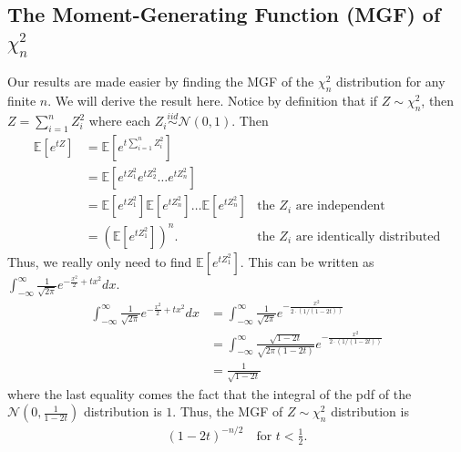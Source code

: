 \documentclass{article}
\begin{document}
    \subsection{The Moment-Generating Function (MGF) of $\chi^2_n$}
Our results are made easier by finding the MGF of the $\chi_n^2$ distribution for any finite $n$. We will derive the result here. Notice by definition that if $Z \sim \chi^2_n$, then $Z = \sum_{i=1}^n Z_i^2$ where each $Z_i \overset{iid}{\sim} \mathcal{N}(0,1)$. Then 
\begin{align*}
    \mathbb{E}[e^{tZ}]&=\mathbb{E}[e^{t\sum_{i=1}^n Z_i^2}]\\
    &=\mathbb{E}[e^{tZ_1^2}e^{tZ_2^2}\ldots e^{tZ_n^2}]\\
    &=\mathbb{E}[e^{tZ_1^2}]\mathbb{E}[e^{tZ_n^2}]\ldots\mathbb{E}[e^{tZ_n^2}] & \text{the $Z_i$ are independent}\\
    &=(\mathbb{E}[e^{tZ_1^2}])^n. & \text{the $Z_i$ are identically distributed}
\end{align*}
Thus, we really only need to find $\mathbb{E}[e^{tZ_1^2}]$. This can be written as $\int_{-\infty}^\infty \frac{1}{\sqrt{2\pi}} e^{-\frac{x^2}{2}+tx^2}dx.$ 
\begin{align*}
  \int_{-\infty}^\infty \frac{1}{\sqrt{2\pi}} e^{-\frac{x^2}{2}+tx^2}dx&=
  \int_{-\infty}^\infty \frac{1}{\sqrt{2\pi}} e^{-\frac{x^2}{2\cdot (1/(1-2t))}}\\
  &=\int_{-\infty}^\infty \frac{\sqrt{1-2t}}{\sqrt{2\pi(1-2t)}} e^{-\frac{x^2}{2\cdot (1/(1-2t))}}\\
  &=\frac{1}{\sqrt{1-2t}}
\end{align*}
where the last equality comes the fact that the integral of the pdf of the $\mathcal{N}(0,\frac{1}{1-2t})$ distribution is $1$. Thus, the MGF of $Z \sim \chi^2_n$ distribution is \begin{align*}
    (1-2t)^{-n/2} \quad \text{for $t<\frac{1}{2}$}.
\end{align*}
\end{document}

